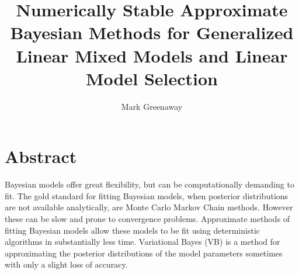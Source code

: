 \documentclass[PhD,stats]{usydthesis}[12pt]
\title{Numerically Stable Approximate Bayesian Methods
    	 for Generalized Linear Mixed Models
			 and Linear Model Selection}
\author{Mark Greenaway}
\begin{document}
\makeatletter
 
 


\makeatother

\maketitle

\tableofcontents
\listoffigures

\section{Abstract}

Bayesian models offer great flexibility, but can be computationally demanding to fit. The gold standard for
fitting Bayesian models, when posterior  distributions are not available analytically, are Monte Carlo Markov
Chain methods. However these can be slow and prone to convergence problems. Approximate methods of fitting
Bayesian models allow these models to be fit using deterministic algorithms in substantially less time.
Variational Bayes (VB) is a method for approximating the posterior distributions of the model parameters
sometimes with only a slight loss of accuracy.
\end{document}
